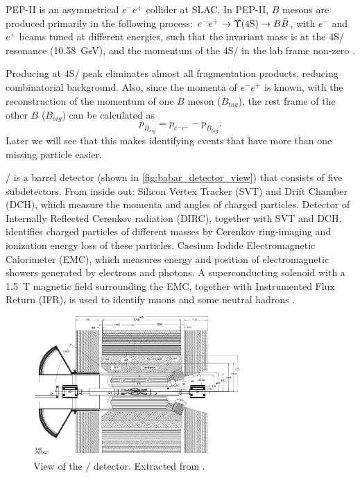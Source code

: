 PEP-II is an asymmetrical $e^- e^+$ collider at SLAC.
In PEP-II, $B$ mesons are produced primarily in the following process:
$e^- e^+ \rightarrow \Y4S/ \rightarrow B \bar{B}$, with
$e^-$ and $e^+$ beams tuned at different energies,
such that the invariant mass is at the \Y4S/ resonance (\SI{10.58}{GeV}),
and the momentum of the \Y4S/ in the lab frame
non-zero \cite{Harrison:1998yr}.

Producing at \Y4S/ peak eliminates almost all fragmentation products, reducing
combinatorial background.
Also, since the momenta of $e^- e^+$ is known, with the reconstruction of the
momentum of one $B$ meson ($B_{tag}$), the rest frame of the other $B$
($B_{sig}$) can be calculated as
\begin{equation}
    p_{B_{sig}} = p_{e^-e^+} - p_{B_{tag}}.
\end{equation}
Later we will see that this makes identifying events that have more than one
missing particle easier.

\BaBar/ is a barrel detector (shown in \autoref{fig:babar_detector_view})
that consists of five subdetectors.
From inside out:
Silicon Vertex Tracker (SVT) and Drift Chamber (DCH), which measure the momenta
and angles of charged particles.
Detector of Internally Reflected Cerenkov radiation (DIRC), together with SVT
and DCH, identifies charged particles of different masses by Cerenkov
ring-imaging and ionization energy loss of these particles.
Caesium Iodide Electromagnetic Calorimeter (EMC), which measures energy and
position of electromagnetic showers generated by electrons and photons.
A superconducting solenoid with a \SI{1.5}{T} magnetic field surrounding the
EMC, together with Instrumented Flux Return (IFR), is used to identify muons and
some neutral hadrons \cite{Lees:2013uzd}.

\begin{figure}[ht]
    \centering
    \includegraphics[width=0.7\textwidth]{figs/babar_detector_view.pdf}
    \caption{
        View of the \BaBar/ detector.
        Extracted from \cite{Boutigny:1995ib}.
    }
    \label{fig:babar_detector_view}
\end{figure}

